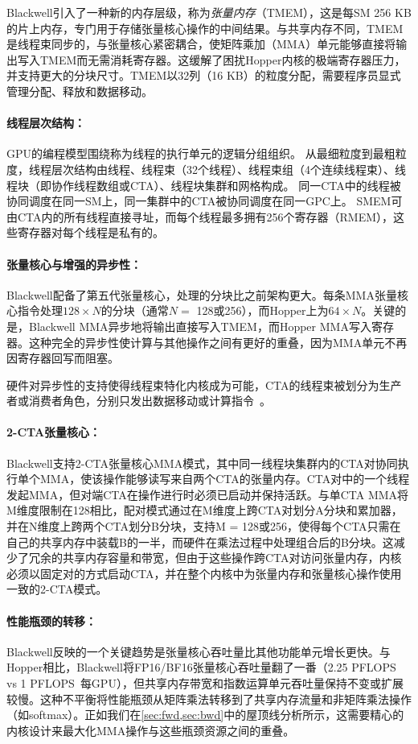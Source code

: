 Blackwell引入了一种新的内存层级，称为\emph{张量内存}（TMEM），这是每SM 256 KB的片上内存，专门用于存储张量核心操作的中间结果。与共享内存不同，TMEM是线程束同步的，与张量核心紧密耦合，使矩阵乘加（MMA）单元能够直接将输出写入TMEM而无需消耗寄存器。这缓解了困扰Hopper内核的极端寄存器压力，并支持更大的分块尺寸。TMEM以32列（16 KB）的粒度分配，需要程序员显式管理分配、释放和数据移动。

\paragraph{线程层次结构：}
GPU的编程模型围绕称为线程的执行单元的逻辑分组组织。
从最细粒度到最粗粒度，线程层次结构由线程、线程束（32个线程）、线程束组（4个连续线程束）、线程块（即协作线程数组或CTA）、线程块集群和网格构成。
同一CTA中的线程被协同调度在同一SM上，同一集群中的CTA被协同调度在同一GPC上。
SMEM可由CTA内的所有线程直接寻址，而每个线程最多拥有256个寄存器（RMEM），这些寄存器对每个线程是私有的。

\paragraph{张量核心与增强的异步性：}
Blackwell配备了第五代张量核心，处理的分块比之前架构更大。每条MMA张量核心指令处理$128 \times N$的分块（通常$N = $ 128或256），而Hopper上为$64 \times N$。关键的是，Blackwell MMA异步地将输出直接写入TMEM，而Hopper MMA写入寄存器。这种完全的异步性使计算与其他操作之间有更好的重叠，因为MMA单元不再因寄存器回写而阻塞。

硬件对异步性的支持使得线程束特化内核成为可能，CTA的线程束被划分为生产者或消费者角色，分别只发出数据移动或计算指令~\citep{warp-specialization-2011}。

\paragraph{2-CTA张量核心：}
Blackwell支持2-CTA张量核心MMA模式，其中同一线程块集群内的CTA对协同执行单个MMA，使该操作能够读写来自两个CTA的张量内存。CTA对中的一个线程发起MMA，但对端CTA在操作进行时必须已启动并保持活跃。与单CTA MMA将M维度限制在128相比，配对模式通过在M维度上跨CTA对划分A分块和累加器，并在N维度上跨两个CTA划分B分块，支持M = 128或256，使得每个CTA只需在自己的共享内存中装载B的一半，而硬件在乘法过程中处理组合后的B分块。这减少了冗余的共享内存容量和带宽，但由于这些操作跨CTA对访问张量内存，内核必须以固定对的方式启动CTA，并在整个内核中为张量内存和张量核心操作使用一致的2-CTA模式。

\paragraph{性能瓶颈的转移：}
Blackwell反映的一个关键趋势是张量核心吞吐量比其他功能单元增长更快。与Hopper相比，Blackwell将FP16/BF16张量核心吞吐量翻了一番（2.25 PFLOPS~\citep{nvidia2024nvidia} vs 1 PFLOPS~\citep{nvidia2022nvidia}每GPU），但共享内存带宽和指数运算单元吞吐量保持不变或扩展较慢。这种不平衡将性能瓶颈从矩阵乘法转移到了共享内存流量和非矩阵乘法操作（如softmax）。正如我们在\cref{sec:fwd,sec:bwd}中的屋顶线分析所示，这需要精心的内核设计来最大化MMA操作与这些瓶颈资源之间的重叠。

